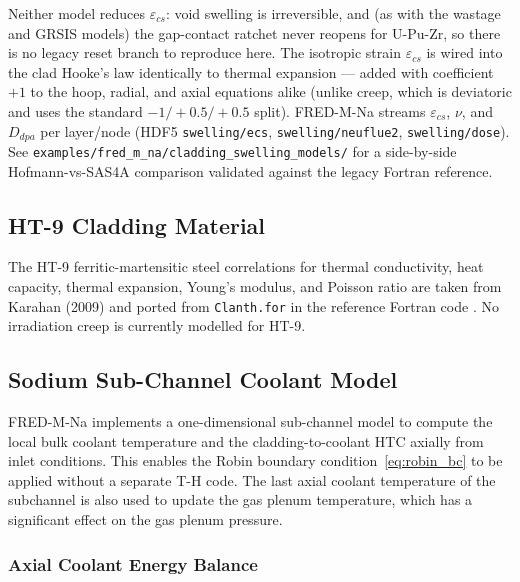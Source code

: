 \begin{refsection}
Neither model reduces $\varepsilon_{cs}$: void swelling is
irreversible, and (as with the wastage and GRSIS models) the gap-contact
ratchet never reopens for U-Pu-Zr, so there is no legacy reset branch to
reproduce here.  The isotropic strain $\varepsilon_{cs}$ is wired into
the clad Hooke's law identically to thermal expansion --- added with
coefficient $+1$ to the hoop, radial, and axial equations alike (unlike
creep, which is deviatoric and uses the standard $-1/+0.5/+0.5$ split).
FRED-M-Na streams $\varepsilon_{cs}$, $\nu$, and $D_{dpa}$ per layer/node
(HDF5 \texttt{swelling/ecs}, \texttt{swelling/neuflue2},
\texttt{swelling/dose}).  See
\texttt{examples/fred\_m\_na/cladding\_swelling\_models/} for a
side-by-side Hofmann-vs-SAS4A comparison validated against the legacy
Fortran reference.

\subsection{HT-9 Cladding Material}
\label{sec:ht9}

The HT-9 ferritic-martensitic steel correlations for thermal conductivity, heat capacity, thermal expansion, Young's modulus, and Poisson ratio are taken from Karahan (2009) \cite{karahan2009} and ported from \texttt{Clanth.for} in the reference Fortran code \cite{timpanoFredM}. No irradiation creep is currently modelled for HT-9.

\subsection{Sodium Sub-Channel Coolant Model}
\label{sec:subchannel_mna}

FRED-M-Na implements a one-dimensional sub-channel model to compute the local bulk coolant temperature and the cladding-to-coolant HTC axially from inlet conditions.  This enables the Robin boundary condition~\eqref{eq:robin_bc} to be applied without a separate T-H code. The last axial coolant temperature of the subchannel is also used to update the gas plenum temperature, which has a significant effect on the gas plenum pressure.

\subsubsection{Axial Coolant Energy Balance}


\end{refsection}
